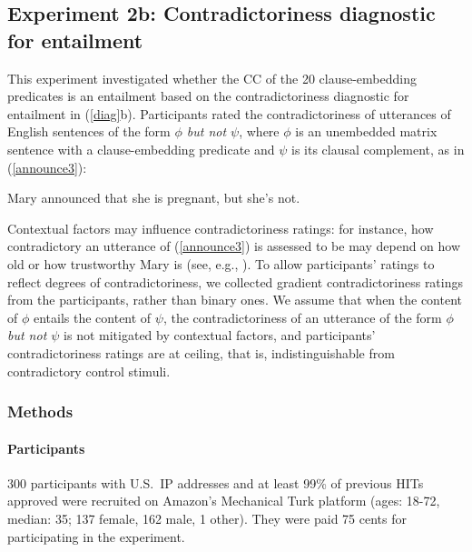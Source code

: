 \documentclass[11pt,fleqn]{article}
\newcommand{\6}{\mbox{$[\hspace*{-.6mm}[$}}
\newcommand{\9}{\mbox{$]\hspace*{-.6mm}]$}}
\begin{document}
\subsection{Experiment 2b: Contradictoriness diagnostic for entailment}\label{s32}

This experiment investigated whether the CC of the 20 clause-embedding predicates is an entailment based on the contradictoriness diagnostic for entailment in (\ref{diag}b). Participants rated the contradictoriness of utterances of English sentences of the form {\em $\phi$ but not $\psi$}, where $\phi$ is an unembedded matrix sentence with a clause-embedding predicate and $\psi$ is its clausal complement, as in (\ref{announce3}):

\begin{exe}
\ex\label{announce3} Mary announced that she is pregnant, but she's not.
\end{exe}
Contextual factors may influence contradictoriness ratings: for instance, how contradictory an utterance of (\ref{announce3}) is assessed to be may depend on how old or how trustworthy Mary is (see, e.g., \citealt{schlenker10,demarneffe-etal2012}). To allow participants' ratings to reflect degrees of contradictoriness, we collected gradient contradictoriness ratings from the participants, rather than binary ones. We assume that when the content of $\phi$ entails the content of $\psi$, the contradictoriness of an utterance of the form {\em $\phi$ but not $\psi$} is not mitigated by contextual factors, and participants' contradictoriness ratings are at ceiling, that is, indistinguishable from contradictory control stimuli.

\subsubsection{Methods}

\paragraph{Participants} 300 participants with U.S.\ IP addresses and at least 99\% of previous HITs approved were recruited on Amazon's Mechanical Turk platform (ages: 18-72, median: 35; 137 female, 162 male, 1 other). They were paid 75 cents for participating in the experiment.
\end{document}
